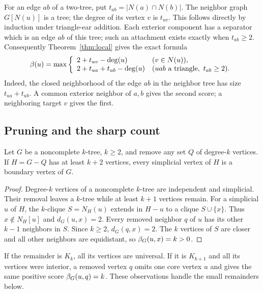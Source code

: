 For an edge $ab$ of a two-tree, put $t_{ab}=|N(a)\cap N(b)|$.
The neighbor graph $G[N(u)]$ is a tree; the degree of its vertex $v$ is
$t_{uv}$. This follows directly by induction under triangle-ear addition.
Each exterior component has a separator which is an edge $ab$ of this tree;
such an attachment exists exactly when $t_{ab}\ge2$. Consequently
Theorem~\ref{thm:local} gives the exact formula
\begin{equation}\label{eq:local-two}
\beta(u)=\max\left\{
\begin{array}{ll}
2+t_{uv}-\operatorname{deg}(u)&(v\in N(u)),\\
2+t_{ua}+t_{ub}-\operatorname{deg}(u)&(uab\text{ a triangle},\ t_{ab}\ge2).
\end{array}\right.
\end{equation}
Indeed, the closed neighborhood of the edge $ab$ in the neighbor tree has
size $t_{ua}+t_{ub}$. A common exterior neighbor of $a,b$ gives the second
score; a neighboring target $v$ gives the first.

\subsection{Pruning and the sharp count}
\begin{lemma}[Pruning]\label{lem:pruning}
Let $G$ be a noncomplete $k$-tree, $k\ge2$, and remove any set $Q$ of
degree-$k$ vertices. If $H=G-Q$ has at least $k+2$ vertices, every
simplicial vertex of $H$ is a boundary vertex of $G$.
\end{lemma}
\begin{proof}
Degree-$k$ vertices of a noncomplete $k$-tree are independent and simplicial.
Their removal leaves a $k$-tree while at least $k+1$ vertices remain.
For a simplicial $u$ of $H$, the $k$-clique $S=N_H(u)$ extends in $H-u$
to a clique $S\cup\{x\}$. Thus $x\notin N_H[u]$ and $d_G(u,x)=2$.
Every removed neighbor $q$ of $u$ has its other $k-1$ neighbors in $S$.
Since $k\ge2$, $d_G(q,x)=2$. The $k$ vertices of $S$ are closer and
all other neighbors are equidistant, so $\beta_G(u,x)=k>0$.
\end{proof}
If the remainder is $K_k$, all its vertices are universal. If it is
$K_{k+1}$ and all its vertices were interior, a removed vertex $q$ omits
one core vertex $u$ and gives the same positive score $\beta_G(u,q)=k$.
These observations handle the small remainders below.

